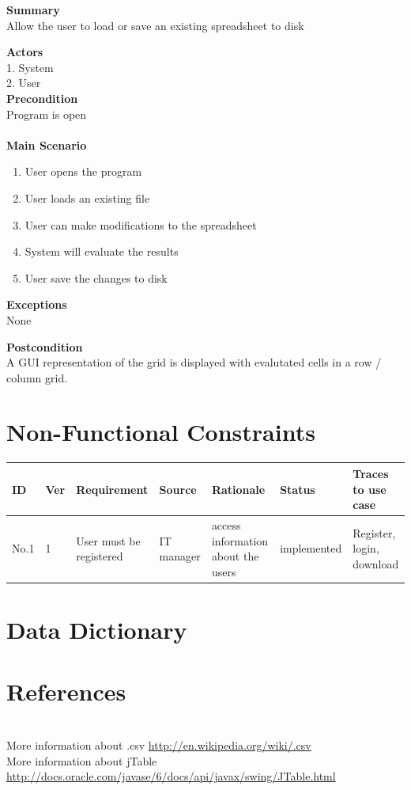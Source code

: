 \documentclass[12pt]{article}
\begin{document}
\noindent
{\bf Summary}\\
Allow the user to load or save an existing spreadsheet to disk

\noindent
{\bf Actors}\\
1. System\\
2. User \\

\noindent
{\bf Precondition}\\
Program is open\\
\noindent\\
{\bf Main Scenario}\\
\vspace*{-0.2in}
\begin{enumerate}
\item User opens the program
\item User loads an existing file
\item User can make modifications to the spreadsheet
\item System will evaluate the results
\item User save the changes to disk
\end{enumerate}

\noindent
{\bf Exceptions}\\
None

\noindent
{\bf Postcondition}\\
A GUI representation of the grid is displayed with evalutated cells in a row / column grid.

\clearpage

\section{Non-Functional Constraints}

\begin{tabular}{| l | l | p{3cm} | l | p{3cm} | l | p{3cm} |}
\hline
ID&Ver&Requirement&Source&Rationale&Status&Traces to use case\\\hline
No.1 & 1 & User must be registered & IT manager & access information about the users&implemented&Register, login, download\\\hline

\end{tabular}

\section{Data Dictionary}

\section{References}
\noindent\\
More information about .csv \href{http://en.wikipedia.org/wiki/.csv}{http://en.wikipedia.org/wiki/.csv}\\
More information about jTable \href{http://docs.oracle.com/javase/6/docs/api/javax/swing/JTable.html}{http://docs.oracle.com/javase/6/docs/api/javax/swing/JTable.html}
\end{document}
